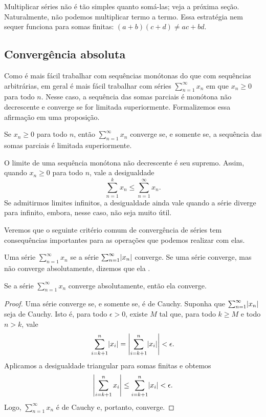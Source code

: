 Multiplicar séries não é tão simples quanto somá-las; veja a próxima
seção.
Naturalmente, não podemos multiplicar
termo a termo. Essa estratégia nem sequer funciona para somas finitas:
$(a+b)(c+d) \neq ac+bd$.

\subsection{Convergência absoluta}

Como é mais fácil trabalhar com sequências monótonas do que com sequências arbitrárias,
em geral é mais fácil trabalhar com séries $\sum_{n=1}^\infty x_n$ em que $x_n \geq 0$ para
todo $n$. Nesse caso, a sequência das somas parciais é monótona não decrescente
e converge se for limitada superiormente.
Formalizemos essa afirmação em uma proposição.

\begin{prop}
Se $x_n \geq 0$ para todo $n$, então $\sum_{n=1}^\infty x_n$ converge se, e somente se,
a sequência das somas parciais é limitada superiormente.
\end{prop}

O limite de uma sequência monótona não decrescente é seu supremo.
Assim, quando $x_n \geq 0$ para todo $n$, vale a
desigualdade
\begin{equation*}
\sum_{n=1}^k x_n \leq
\sum_{n=1}^\infty x_n .
\end{equation*}
Se admitirmos limites infinitos, a desigualdade ainda
vale quando a série diverge para infinito, embora, nesse caso, não seja
muito útil.

Veremos que o seguinte critério comum de convergência de séries
tem consequências importantes para as operações que podemos realizar com elas.

\begin{defn}
Uma série $\sum_{n=1}^\infty x_n$
\emph{} se
a série $\sum_{n=1}^\infty \lvert {x_n} \rvert$ converge.
Se uma série converge, mas não converge absolutamente, dizemos
que ela \emph{}.
\end{defn}

\begin{prop}
Se a série $\sum_{n=1}^\infty x_n$ converge absolutamente, então ela converge.
\end{prop}

\begin{proof}
Uma série converge se, e somente se, é de Cauchy.
Suponha que $\sum_{n=1}^\infty \lvert {x_n} \rvert$ seja de Cauchy. Isto é, para todo $\epsilon > 0$,
existe $M$ tal que, para todo $k \geq M$ e todo $n > k$, vale 
\begin{equation*}
\sum_{i=k+1}^n \lvert {x_i} \rvert 
=
\left\lvert { \sum_{i=k+1}^n \lvert {x_i} \rvert } \right\rvert
<
\epsilon .
\end{equation*}
Aplicamos a desigualdade triangular para somas finitas e obtemos
\begin{equation*}
\left\lvert { \sum_{i=k+1}^n x_i } \right\rvert
\leq
\sum_{i=k+1}^n \lvert {x_i} \rvert
<
\epsilon .
\end{equation*}
Logo, $\sum_{n=1}^\infty x_n$ é de Cauchy e, portanto, converge.
\end{proof}

